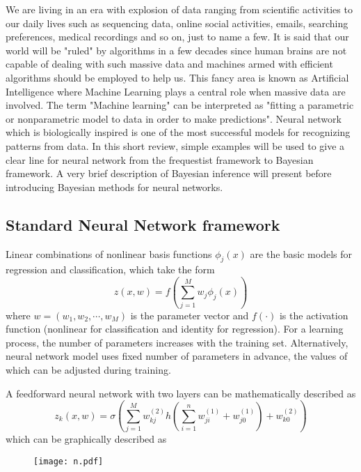 \documentclass[paper=a4, fontsize=12pt]{scrartcl}	%
\numberwithin{equation}{section}					%
\numberwithin{figure}{section}					%
\numberwithin{table}{section}					%
\begin{document}
We are living in an era with explosion of data ranging from scientific activities to our daily lives such as sequencing data, online social activities, emails, searching preferences, medical recordings and so on, just to name a few. It is said that our world will be "ruled" by algorithms in a few decades since human brains are not capable of dealing with such massive data and machines armed with efficient algorithms should be employed to help us. This fancy area is known as Artificial Intelligence where Machine Learning plays a central role when massive data are involved. The term "Machine learning" can be interpreted as "fitting a parametric or nonparametric model to data in order to make predictions". Neural network which is biologically inspired is one of the most successful models for recognizing patterns from data. In this short review, simple examples will be used to give a clear line for neural network from the frequestist framework to Bayesian framework. A very brief description of Bayesian inference will present before introducing Bayesian methods for neural networks. 

\subsection{Standard Neural Network framework}
Linear combinations of nonlinear basis functions $\phi_j(x)$ are the basic models for regression and classification, which take the form
\begin{equation}
z(x, w) = f\left( \sum_{j=1}^Mw_j\phi_j(x) \right)
\end{equation} 
where $w=(w_1, w_2, \cdots, w_M)$ is the parameter vector and $f(\cdot)$ is the activation function (nonlinear for classification and identity for regression). For a learning process, the number of parameters increases with the training set. Alternatively, neural network model uses fixed number of parameters in advance, the values of which can be adjusted during training. 

A feedforward neural network with two layers can be mathematically described as 
\begin{equation}
z_k(x, w) = \sigma\left( \sum_{j=1}^Mw_{kj}^{(2)}h\left(\sum_{i=1}^nw_{ji}^{(1)}+w_{j0}^{(1)}\right) + w_{k0}^{(2)}\right)
\end{equation}
which can be graphically described as 
\begin{figure}[\h]
\centering
\texttt{[image: n.pdf]}
\end{figure}
\end{document}
